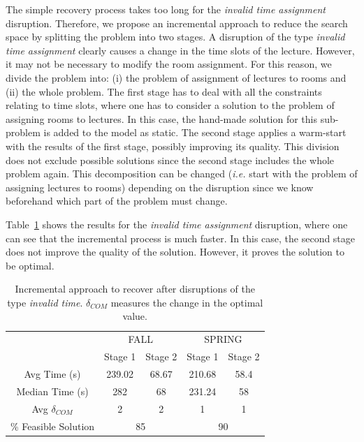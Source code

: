 \documentclass[runningheads]{llncs}
\begin{document}
The simple recovery process takes too long for the \textit{invalid time assignment} disruption. Therefore, we propose an incremental approach to reduce the search space by splitting the problem into two stages.  A disruption of the type \textit{invalid time assignment} clearly causes a change in the time slots of the lecture. However, it may not be necessary to modify the room assignment. For this reason, we divide the problem into: (i) the problem of assignment of lectures to rooms and (ii) the whole problem. The first stage has to deal with all the constraints relating to time slots, where one has to consider a solution to the problem of assigning rooms to lectures. In this case, the hand-made solution for this sub-problem is added to the model as static. The second stage applies a warm-start with the results of the first stage, possibly improving its quality. This division does not exclude possible solutions since the second stage includes the whole problem again. This decomposition can be changed (\emph{i.e.} start with the problem of assigning lectures to rooms) depending on the disruption since we know beforehand which part of the problem must change. 

Table~\ref{tab:ite} shows the results for the \textit{invalid time assignment} disruption, where one can see that the incremental process is much faster. In this case, the second stage does not improve the quality of the solution. However, it proves the solution to be optimal.

\begin{table}[t]
\centering
\caption{Incremental approach to recover after disruptions of the type \textit{invalid time}. $\delta_{COM}$ measures the change in the optimal value.}
\label{tab:ite}
\begin{tabular}{c|c|c|c|c|}
\cline{2-5}
                                                      & \multicolumn{2}{c|}{\textsc{FALL}} & \multicolumn{2}{c|}{\textsc{SPRING}} \\ \cline{2-5} 
                                                      & Stage 1     & Stage 2     & Stage 1      & Stage 2      \\ \hline
\multicolumn{1}{|c|}{Avg Time (s)}                & 239.02 & 68.67 & 210.68      & 58.4         \\ \hline
\multicolumn{1}{|c|}{Median Time (s)}                 & 282         & 68          & 231.24       & 58           \\ \hline
\multicolumn{1}{|c|}{Avg $\delta_{COM}$ }                     & 2           & 2           & 1            & 1            \\ \hline
\multicolumn{1}{|c|}{\% Feasible Solution} & \multicolumn{2}{c|}{85}   & \multicolumn{2}{c|}{90}     \\ \hline
\end{tabular}
\vspace{-.5cm}
\end{table}
\end{document}
